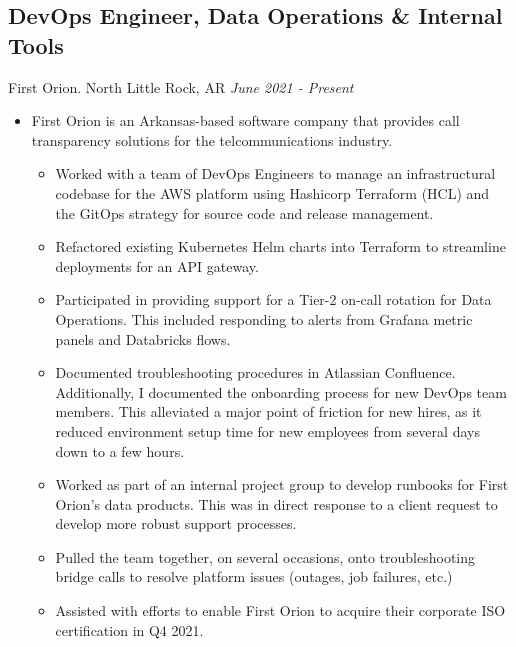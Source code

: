 \documentclass[11pt]{article}
\begin{document}
\subsection*{DevOps Engineer, Data Operations \& Internal Tools}
First Orion. North Little Rock, AR \hfill \textit{June 2021 - Present} \\
\begin{itemize}
	\item First Orion is an Arkansas-based software company that provides call transparency solutions for the telcommunications industry.
 \begin{itemize}
  \item Worked with a team of DevOps Engineers to manage an infrastructural codebase for the AWS platform using Hashicorp Terraform (HCL) and the GitOps strategy for source code and release management.
  \item Refactored existing Kubernetes Helm charts into Terraform to streamline deployments for an API gateway.
  \item Participated in providing support for a Tier-2 on-call rotation for Data Operations. This included responding to alerts from Grafana metric panels and Databricks flows.
  \item Documented troubleshooting procedures in Atlassian Confluence. Additionally, I documented the onboarding process for new DevOps team members. This alleviated a major point of friction for new hires, as it reduced environment setup time for new employees from several days down to a few hours.
  \item Worked as part of an internal project group to develop runbooks for First Orion's data products. This was in direct response to a client request to develop more robust support processes.
  \item Pulled the team together, on several occasions, onto troubleshooting bridge calls to resolve platform issues (outages, job failures, etc.)
  \item Assisted with efforts to enable First Orion to acquire their corporate ISO certification in Q4 2021.
 \end{itemize}
\end{itemize}
\\
\end{document}
